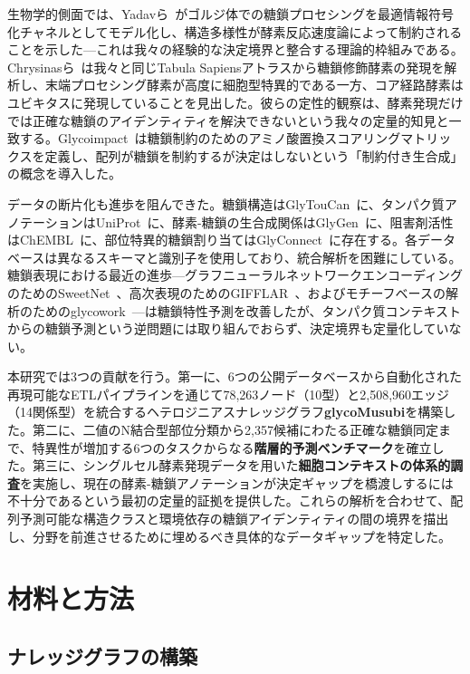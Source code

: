 \documentclass[11pt,a4paper]{ltjsarticle}
\begin{document}
生物学的側面では、Yadavら~\cite{yadav2022}がゴルジ体での糖鎖プロセシングを最適情報符号化チャネルとしてモデル化し、構造多様性が酵素反応速度論によって制約されることを示した---これは我々の経験的な決定境界と整合する理論的枠組みである。Chrysinasら~\cite{chrysinas2024}は我々と同じTabula Sapiensアトラスから糖鎖修飾酵素の発現を解析し、末端プロセシング酵素が高度に細胞型特異的である一方、コア経路酵素はユビキタスに発現していることを見出した。彼らの定性的観察は、酵素発現だけでは正確な糖鎖のアイデンティティを解決できないという我々の定量的知見と一致する。Glycoimpact~\cite{glycoimpact2024}は糖鎖制約のためのアミノ酸置換スコアリングマトリックスを定義し、配列が糖鎖を制約するが決定はしないという「制約付き生合成」の概念を導入した。

データの断片化も進歩を阻んできた。糖鎖構造はGlyTouCan~\cite{tiemeyer2017}に、タンパク質アノテーションはUniProt~\cite{uniprot2023}に、酵素-糖鎖の生合成関係はGlyGen~\cite{york2020}に、阻害剤活性はChEMBL~\cite{zdrazil2024}に、部位特異的糖鎖割り当てはGlyConnect~\cite{alocci2019}に存在する。各データベースは異なるスキーマと識別子を使用しており、統合解析を困難にしている。糖鎖表現における最近の進歩---グラフニューラルネットワークエンコーディングのためのSweetNet~\cite{burkholz2022}、高次表現のためのGIFFLAR~\cite{thomes2024}、およびモチーフベースの解析のためのglycowork~\cite{thomes2021}---は糖鎖特性予測を改善したが、タンパク質コンテキストからの糖鎖予測という逆問題には取り組んでおらず、決定境界も定量化していない。

本研究では3つの貢献を行う。第一に、6つの公開データベースから自動化された再現可能なETLパイプラインを通じて78,263ノード（10型）と2,508,960エッジ（14関係型）を統合するヘテロジニアスナレッジグラフ\textbf{glycoMusubi}を構築した。第二に、二値のN結合型部位分類から2,357候補にわたる正確な糖鎖同定まで、特異性が増加する6つのタスクからなる\textbf{階層的予測ベンチマーク}を確立した。第三に、シングルセル酵素発現データを用いた\textbf{細胞コンテキストの体系的調査}を実施し、現在の酵素-糖鎖アノテーションが決定ギャップを橋渡しするには不十分であるという最初の定量的証拠を提供した。これらの解析を合わせて、配列予測可能な構造クラスと環境依存の糖鎖アイデンティティの間の境界を描出し、分野を前進させるために埋めるべき具体的なデータギャップを特定した。

\section{材料と方法}

\subsection{ナレッジグラフの構築}
\end{document}
